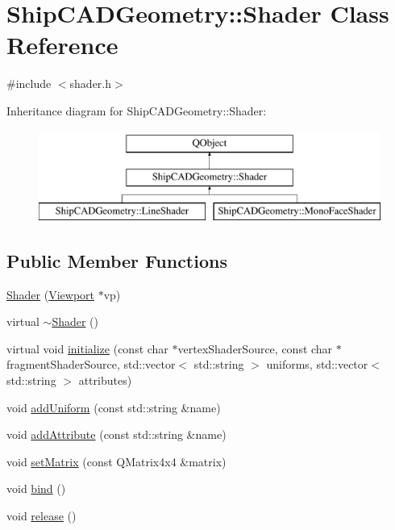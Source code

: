 \hypertarget{classShipCADGeometry_1_1Shader}{\section{Ship\-C\-A\-D\-Geometry\-:\-:Shader Class Reference}
\label{classShipCADGeometry_1_1Shader}
}


{\ttfamily \#include $<$shader.\-h$>$}

Inheritance diagram for Ship\-C\-A\-D\-Geometry\-:\-:Shader\-:\begin{figure}[H]
\begin{center}
\leavevmode
\includegraphics[height=3.000000cm]{classShipCADGeometry_1_1Shader}
\end{center}
\end{figure}
\subsection*{Public Member Functions}
\begin{DoxyCompactItemize}
\item 
\hyperlink{classShipCADGeometry_1_1Shader_a36bc24054e22fb965b04dae9a2b76eb7}{Shader} (\hyperlink{classShipCADGeometry_1_1Viewport}{Viewport} $\ast$vp)
\item 
virtual \hyperlink{classShipCADGeometry_1_1Shader_aff01df87e8a102f270b5b135a295e59d}{$\sim$\-Shader} ()
\item 
virtual void \hyperlink{classShipCADGeometry_1_1Shader_a011fae279e362f548e8c4e4b35b7291e}{initialize} (const char $\ast$vertex\-Shader\-Source, const char $\ast$fragment\-Shader\-Source, std\-::vector$<$ std\-::string $>$ uniforms, std\-::vector$<$ std\-::string $>$ attributes)
\item 
void \hyperlink{classShipCADGeometry_1_1Shader_ac8faec958f9d5806510d39be5f512c8e}{add\-Uniform} (const std\-::string \&name)
\item 
void \hyperlink{classShipCADGeometry_1_1Shader_a6a298be357d7860d859aedbe397b81b9}{add\-Attribute} (const std\-::string \&name)
\item 
void \hyperlink{classShipCADGeometry_1_1Shader_a7d7fe16e4eb06ad1eb19e22b38cff96e}{set\-Matrix} (const Q\-Matrix4x4 \&matrix)
\item 
void \hyperlink{classShipCADGeometry_1_1Shader_a29440ce9478af96ffae40b8928cc03f0}{bind} ()
\item 
void \hyperlink{classShipCADGeometry_1_1Shader_a2c7d1fca280aec57ba648ccdbdeed7a9}{release} ()
\end{DoxyCompactItemize}
